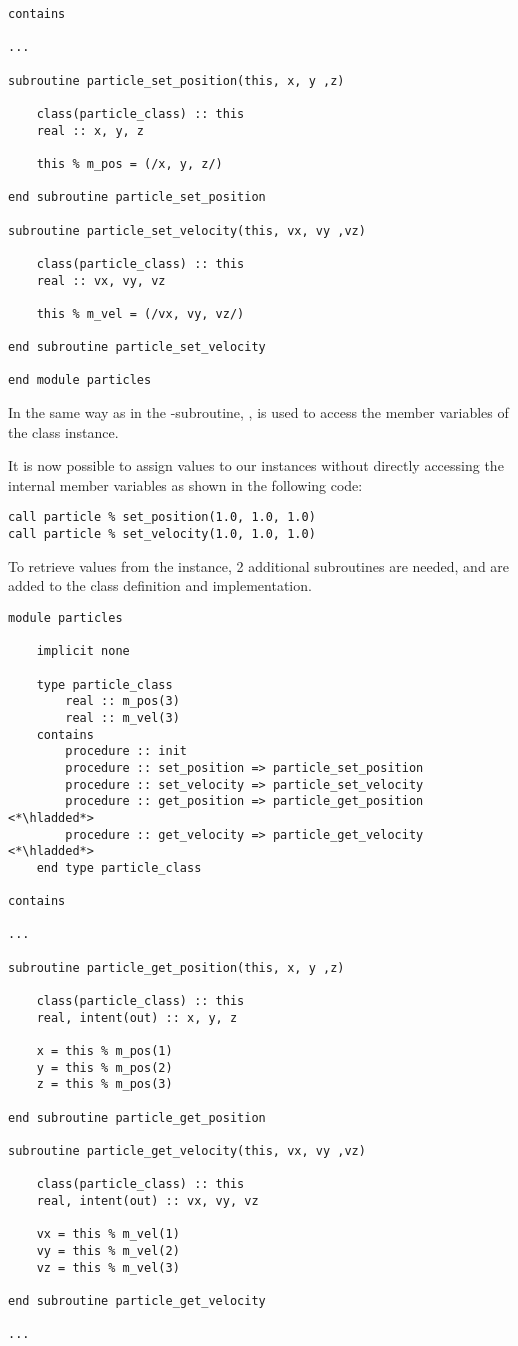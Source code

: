\begin{lstlisting}
contains

...

subroutine particle_set_position(this, x, y ,z)

    class(particle_class) :: this
    real :: x, y, z

    this % m_pos = (/x, y, z/)

end subroutine particle_set_position

subroutine particle_set_velocity(this, vx, vy ,vz)

    class(particle_class) :: this
    real :: vx, vy, vz

    this % m_vel = (/vx, vy, vz/)

end subroutine particle_set_velocity

end module particles        
\end{lstlisting}

In the same way as in the -subroutine, , is used to access the member variables of the class instance. 

It is now possible to assign values to our instances without directly accessing the internal member variables as shown in the following code:

\begin{lstlisting}
call particle % set_position(1.0, 1.0, 1.0)
call particle % set_velocity(1.0, 1.0, 1.0)
\end{lstlisting}

To retrieve values from the instance, 2 additional subroutines are needed,  and  are added to the class definition and implementation.

\begin{lstlisting}
module particles

    implicit none

    type particle_class
        real :: m_pos(3)
        real :: m_vel(3)
    contains
        procedure :: init
        procedure :: set_position => particle_set_position
        procedure :: set_velocity => particle_set_velocity
        procedure :: get_position => particle_get_position <*\hladded*>
        procedure :: get_velocity => particle_get_velocity <*\hladded*>
    end type particle_class

contains

...

subroutine particle_get_position(this, x, y ,z)

    class(particle_class) :: this
    real, intent(out) :: x, y, z

    x = this % m_pos(1)
    y = this % m_pos(2)
    z = this % m_pos(3)

end subroutine particle_get_position

subroutine particle_get_velocity(this, vx, vy ,vz)

    class(particle_class) :: this
    real, intent(out) :: vx, vy, vz

    vx = this % m_vel(1)
    vy = this % m_vel(2)
    vz = this % m_vel(3)

end subroutine particle_get_velocity

...
\end{lstlisting}

